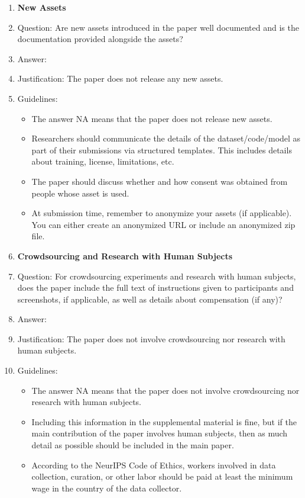 \begin{enumerate}
\item {\bf New Assets}
\item[] Question: Are new assets introduced in the paper well documented and is the documentation provided alongside the assets?
\item[] Answer: \answerNA{}
\item[] Justification: The paper does not release any new assets.
\item[] Guidelines:
  \begin{itemize}
  \item The answer NA means that the paper does not release new assets.
  \item Researchers should communicate the details of the dataset/code/model as part of their submissions via structured templates. This includes details about training, license, limitations, etc.
  \item The paper should discuss whether and how consent was obtained from people whose asset is used.
  \item At submission time, remember to anonymize your assets (if applicable). You can either create an anonymized URL or include an anonymized zip file.
  \end{itemize}

\item {\bf Crowdsourcing and Research with Human Subjects}
\item[] Question: For crowdsourcing experiments and research with human subjects, does the paper include the full text of instructions given to participants and screenshots, if applicable, as well as details about compensation (if any)?
\item[] Answer: \answerNA{}
\item[] Justification: The paper does not involve crowdsourcing nor research with human subjects.
\item[] Guidelines:
  \begin{itemize}
  \item The answer NA means that the paper does not involve crowdsourcing nor research with human subjects.
  \item Including this information in the supplemental material is fine, but if the main contribution of the paper involves human subjects, then as much detail as possible should be included in the main paper.
  \item According to the NeurIPS Code of Ethics, workers involved in data collection, curation, or other labor should be paid at least the minimum wage in the country of the data collector.
  \end{itemize}


\end{enumerate}

